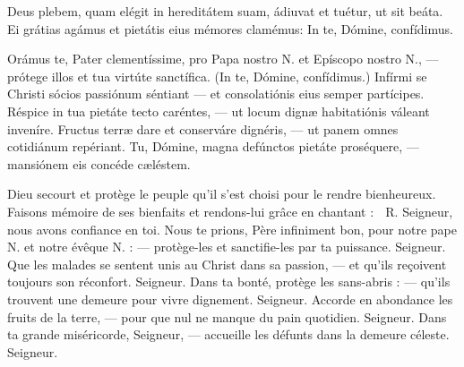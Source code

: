\documentclass[RG2023_CarnetCommun.tex]{subfiles}
\begin{document}


Deus plebem, quam elégit in hereditátem suam, ádiuvat
et tuétur, ut sit beáta. Ei grátias agámus et pietátis
eius mémores clamémus:
In te, Dómine, confídimus.

Orámus te, Pater clementíssime, pro Papa nostro N. et
Epíscopo nostro N.,
–– prótege illos et tua virtúte sanctífica.
(In te, Dómine, confídimus.)
Infírmi se Christi sócios passiónum séntiant
–– et consolatiónis eius semper partícipes.
Réspice in tua pietáte tecto caréntes,
–– ut locum dignæ habitatiónis váleant inveníre.
Fructus terræ dare et conserváre dignéris,
–– ut panem omnes cotidiánum repériant.
Tu, Dómine, magna defúnctos pietáte proséquere,
–– mansiónem eis concéde cæléstem.

Dieu secourt et protège le peuple
qu’il s’est choisi pour le rendre
bienheureux. Faisons mémoire
de ses bienfaits et rendons-lui
grâce en chantant :
􀀽 R. Seigneur, nous avons
confiance en toi.
Nous te prions, Père infiniment
bon, pour notre pape N. et notre
évêque N. : — protège-les et
sanctifie-les par ta puissance. Seigneur.
Que les malades se sentent unis
au Christ dans sa passion, — et
qu’ils reçoivent toujours son réconfort.
Seigneur.
Dans ta bonté, protège les sans-abris
: — qu’ils trouvent une
demeure pour vivre dignement.
Seigneur.
Accorde en abondance les fruits
de la terre, — pour que nul ne
manque du pain quotidien. Seigneur.
Dans ta grande miséricorde, Seigneur,
— accueille les défunts
dans la demeure céleste. Seigneur.

\end{document}

